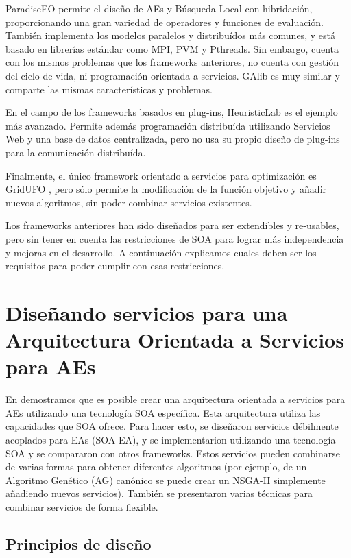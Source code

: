 \documentclass[runningheads]{llncs}
\begin{document}
ParadiseEO \cite{PARADISEO} permite el diseño de AEs y Búsqueda Local con hibridación, proporcionando una gran variedad de operadores y funciones de evaluación. También implementa los modelos paralelos y distribuídos más comunes, y está basado en librerías estándar como MPI, PVM y Pthreads. Sin embargo, cuenta con los mismos problemas que los frameworks anteriores, no cuenta con gestión del ciclo de vida, ni programación orientada a servicios. GAlib \cite{GALIB} es muy similar y comparte las mismas características y problemas. 

En el campo de los frameworks basados en plug-ins, HeuristicLab \cite{HEURISTICLAB} es el ejemplo más avanzado. Permite además programación distribuída utilizando Servicios Web y una base de datos centralizada, pero no usa su propio diseño de plug-ins para la comunicación distribuída.

Finalmente, el único framework orientado a servicios para optimización es GridUFO \cite{GRIDUFO}, pero sólo permite la modificación de la función objetivo y añadir nuevos algoritmos, sin poder combinar servicios existentes.

Los frameworks anteriores han sido diseñados para ser extendibles y
re-usables, pero sin tener en cuenta las restricciones de SOA para
lograr más independencia y mejoras en el desarrollo. A continuación explicamos cuales deben ser los requisitos para poder cumplir con esas restricciones.%
\section{Diseñando servicios para una Arquitectura Orientada a Servicios para AEs}
\label{sec:design}

En \cite{OSGILIATH} demostramos que es posible crear una arquitectura orientada a servicios para AEs utilizando una tecnología SOA específica. Esta arquitectura utiliza las capacidades que SOA ofrece. Para hacer esto, se diseñaron servicios débilmente acoplados para EAs (SOA-EA), y se implementarion utilizando una tecnología SOA y se compararon con otros frameworks. Estos servicios pueden combinarse de varias formas para obtener diferentes algoritmos (por ejemplo, de un Algoritmo Genético (AG) canónico se puede crear un NSGA-II simplemente añadiendo nuevos servicios). También se presentaron varias técnicas para combinar servicios de forma flexible.


\subsection{Principios de diseño}
\end{document}
